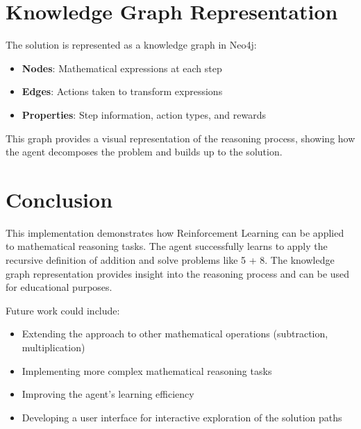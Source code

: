 \documentclass{article}
\begin{document}
\section{Knowledge Graph Representation}

The solution is represented as a knowledge graph in Neo4j:
\begin{itemize}
    \item \textbf{Nodes}: Mathematical expressions at each step
    \item \textbf{Edges}: Actions taken to transform expressions
    \item \textbf{Properties}: Step information, action types, and rewards
\end{itemize}

This graph provides a visual representation of the reasoning process, showing how the agent decomposes the problem and builds up to the solution.

\section{Conclusion}

This implementation demonstrates how Reinforcement Learning can be applied to mathematical reasoning tasks. The agent successfully learns to apply the recursive definition of addition and solve problems like 5 + 8. The knowledge graph representation provides insight into the reasoning process and can be used for educational purposes.

Future work could include:
\begin{itemize}
    \item Extending the approach to other mathematical operations (subtraction, multiplication)
    \item Implementing more complex mathematical reasoning tasks
    \item Improving the agent's learning efficiency
    \item Developing a user interface for interactive exploration of the solution paths
\end{itemize}
\end{document}
